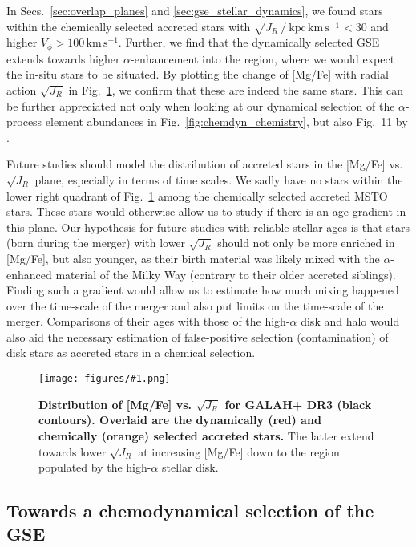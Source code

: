 \documentclass[fleqn,usenatbib]{mnras}
\newcommand{\codeicon}{{\faCloudDownload}}
\newcommand{\codelink}[1]{\href{https://github.com/svenbuder/Accreted-stars-in-GALAH-DR3/tree/main/figures/#1.ipynb}{\codeicon}\,\,}
\newcommand{\oscaption}[2]{\caption{#2 \codelink{#1}}}
\newcommand{\figurecolumnwidth}[3]{\begin{figure} \centering \texttt{[image: figures/\#1.png]}\oscaption{#2}{#3}\label{fig:#1} \end{figure}}
\begin{document}
In Secs.~\ref{sec:overlap_planes} and \ref{sec:gse_stellar_dynamics}, we found stars within the chemically selected accreted stars with $\sqrt{J_R~/~\mathrm{kpc\,km\,s^{-1}}} < 30$ and higher $V_\phi > 100\,\mathrm{km\,s^{-1}}$. Further, we find that the dynamically selected GSE extends towards higher $\alpha$-enhancement into the region, where we would expect the in-situ stars to be situated. By plotting the change of [Mg/Fe] with radial action $\sqrt{J_R}$ in Fig.~\ref{fig:overlap_mgfe_sqrtjr}, we confirm that these are indeed the same stars. This can be further appreciated not only when looking at our dynamical selection of the $\alpha$-process element abundances in Fig.~\ref{fig:chemdyn_chemistry}, but also Fig.~11 by \citet{Naidu2020}.

Future studies should model the distribution of accreted stars in the [Mg/Fe] vs. $\sqrt{J_R}$ plane, especially in terms of time scales. We sadly have no stars within the lower right quadrant of Fig.~\ref{fig:overlap_mgfe_sqrtjr} among the chemically selected accreted MSTO stars. These stars would otherwise allow us to study if there is an age gradient in this plane. Our hypothesis for future studies with reliable stellar ages is that stars (born during the merger) with lower $\sqrt{J_R}$ should not only be more enriched in [Mg/Fe], but also younger, as their birth material was likely mixed with the $\alpha$-enhanced material of the Milky Way (contrary to their older accreted siblings). Finding such a gradient would allow us to estimate how much mixing happened over the time-scale of the merger and also put limits on the time-scale of the merger. Comparisons of their ages with those of the high-$\alpha$ disk and halo would also aid the necessary estimation of false-positive selection (contamination) of disk stars as accreted stars in a chemical selection.

\figurecolumnwidth{overlap_mgfe_sqrtjr}{chronochemodynamic_comparison}{
\textbf{Distribution of [Mg/Fe] vs. $\sqrt{J_R}$ for GALAH+ DR3 (black contours). Overlaid are the dynamically (red) and chemically (orange) selected accreted stars.} The latter extend towards lower $\sqrt{J_R}$ at increasing [Mg/Fe] down to the region populated by the high-$\alpha$ stellar disk.
}

\subsection{Towards a chemodynamical selection of the GSE} \label{sec:towards_chemodyn}
\end{document}
